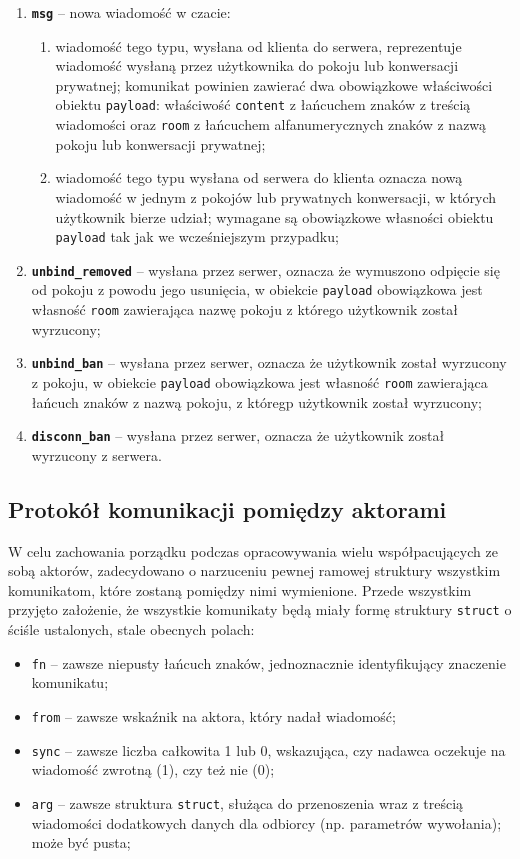 \begin{enumerate}
	\item \textbf{\texttt{msg}} -- nowa wiadomość w czacie:
	\begin{enumerate}
		\item wiadomość tego typu, wysłana od klienta do serwera, reprezentuje wiadomość
		wysłaną przez użytkownika do pokoju lub konwersacji prywatnej; komunikat
		powinien zawierać dwa obowiązkowe właściwości obiektu \texttt{payload}:
		właściwość \texttt{content} z łańcuchem znaków z treścią wiadomości
		oraz \texttt{room} z łańcuchem alfanumerycznych znaków z nazwą pokoju lub
		konwersacji prywatnej;
		\item wiadomość tego typu wysłana od serwera do klienta oznacza nową wiadomość
		w jednym z pokojów lub prywatnych konwersacji, w których użytkownik bierze
		udział; wymagane są obowiązkowe własności obiektu \texttt{payload} tak jak
		we wcześniejszym przypadku;
	\end{enumerate}

	\item \textbf{\texttt{unbind\_removed}} -- wysłana przez serwer, oznacza że
	wymuszono odpięcie się od pokoju z powodu jego usunięcia, w obiekcie
	\texttt{payload} obowiązkowa jest własność \texttt{room} zawierająca nazwę
	pokoju z którego użytkownik został wyrzucony;

	\item \textbf{\texttt{unbind\_ban}} -- wysłana przez serwer, oznacza że użytkownik
	został wyrzucony z pokoju, w obiekcie \texttt{payload} obowiązkowa jest własność
	\texttt{room} zawierająca łańcuch znaków z nazwą pokoju, z któregp użytkownik
	został wyrzucony;

	\item \textbf{\texttt{disconn\_ban}} -- wysłana przez serwer, oznacza że
	użytkownik został wyrzucony z serwera.
\end{enumerate}

\subsection{Protokół komunikacji pomiędzy aktorami}
W celu zachowania porządku podczas opracowywania wielu współpacujących ze
sobą aktorów, zadecydowano o narzuceniu pewnej ramowej struktury wszystkim
komunikatom, które zostaną pomiędzy nimi wymienione. Przede wszystkim przyjęto
założenie, że wszystkie komunikaty będą miały formę struktury \texttt{struct} o
ściśle ustalonych, stale obecnych polach:
\begin{itemize}
	\item \texttt{fn} -- zawsze niepusty łańcuch znaków, jednoznacznie identyfikujący
	znaczenie komunikatu;
	\item \texttt{from} -- zawsze wskaźnik na aktora, który nadał wiadomość;
	\item \texttt{sync} -- zawsze liczba całkowita 1 lub 0, wskazująca, czy nadawca
	oczekuje na wiadomość zwrotną (1), czy też nie (0);
	\item \texttt{arg} -- zawsze struktura \texttt{struct}, służąca do przenoszenia
	wraz z treścią wiadomości dodatkowych danych dla odbiorcy (np. parametrów
	wywołania); może być pusta;
\end{itemize}


